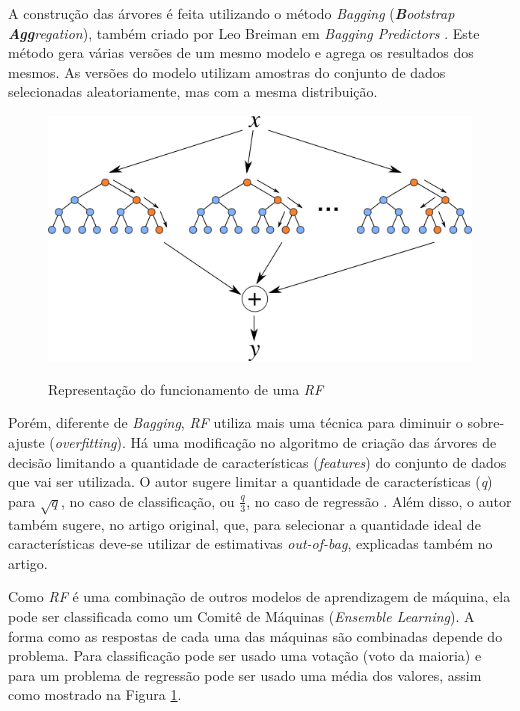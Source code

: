 A construção das árvores é feita utilizando o método \textit{Bagging} (\textit{\textbf{B}ootstrap \textbf{Agg}regation}), também criado por Leo Breiman em \textit{Bagging Predictors} \cite{Breiman:1996:BP:231986.231989}. Este método gera várias versões de um mesmo modelo e agrega os resultados dos mesmos. As versões do modelo utilizam amostras do conjunto de dados selecionadas aleatoriamente, mas com a mesma distribuição.

\begin{figure}[htbp]
    \centering
    \includegraphics[scale=1.0]{monography/img/models/random_forest.png}
    \label{figure:random_forest}
    \caption[Representação do funcionamento de uma \textit{\acrshort{RF}}]{Representação do funcionamento de uma \textit{\acrshort{RF}}\footnotemark}
\end{figure}

Porém, diferente de \textit{Bagging}, \textit{\acrshort{RF}} utiliza mais uma técnica para diminuir o sobre-ajuste (\textit{overfitting}). Há uma modificação no algoritmo de criação das árvores de decisão limitando a quantidade de características (\textit{features}) do conjunto de dados que vai ser utilizada. O autor sugere limitar a quantidade de características (\textit{q}) para $ \sqrt{q} $, no caso de classificação, ou $ \frac{q}{3} $, no caso de regressão \cite{hastie2005elements}. Além disso, o autor também sugere, no artigo original, que, para selecionar a quantidade ideal de características deve-se utilizar de estimativas \textit{out-of-bag}, explicadas também no artigo.

Como \textit{\acrshort{RF}} é uma combinação de outros modelos de aprendizagem de máquina, ela pode ser classificada como um Comitê de Máquinas (\textit{Ensemble Learning}). A forma como as respostas de cada uma das máquinas são combinadas depende do problema. Para classificação pode ser usado uma votação (voto da maioria) e para um problema de regressão pode ser usado uma média dos valores, assim como mostrado na Figura \ref{figure:random_forest}.

